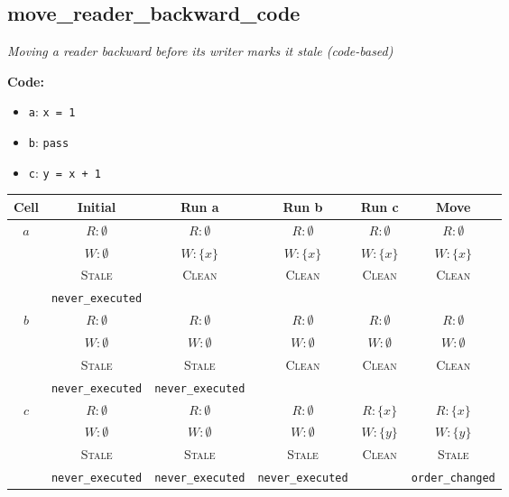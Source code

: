 \documentclass{article}
\begin{document}
\subsection{move\_reader\_backward\_code}
\textit{Moving a reader backward before its writer marks it stale (code-based)}

\textbf{Code:}
\begin{itemize}
  \item \texttt{a}: \verb|x = 1|
  \item \texttt{b}: \verb|pass|
  \item \texttt{c}: \verb|y = x + 1|
\end{itemize}

\begin{center}
\small
\begin{tabular}{|c|c|c|c|c|c|}
\hline
\textbf{Cell} & \textbf{Initial} & \textbf{Run a} & \textbf{Run b} & \textbf{Run c} & \textbf{Move} \\
\hline
\multirow{4}{*}{$a$}
  & $R: \emptyset$ & $R: \emptyset$ & $R: \emptyset$ & $R: \emptyset$ & $R: \emptyset$ \\
  & $W: \emptyset$ & $W: \{x\}$ & $W: \{x\}$ & $W: \{x\}$ & $W: \{x\}$ \\
  & \textsc{Stale} & \textsc{Clean} & \textsc{Clean} & \textsc{Clean} & \textsc{Clean} \\
  & \footnotesize\texttt{never\_executed} &  &  &  &  \\
\hline
\multirow{4}{*}{$b$}
  & $R: \emptyset$ & $R: \emptyset$ & $R: \emptyset$ & $R: \emptyset$ & $R: \emptyset$ \\
  & $W: \emptyset$ & $W: \emptyset$ & $W: \emptyset$ & $W: \emptyset$ & $W: \emptyset$ \\
  & \textsc{Stale} & \textsc{Stale} & \textsc{Clean} & \textsc{Clean} & \textsc{Clean} \\
  & \footnotesize\texttt{never\_executed} & \footnotesize\texttt{never\_executed} &  &  &  \\
\hline
\multirow{4}{*}{$c$}
  & $R: \emptyset$ & $R: \emptyset$ & $R: \emptyset$ & $R: \{x\}$ & $R: \{x\}$ \\
  & $W: \emptyset$ & $W: \emptyset$ & $W: \emptyset$ & $W: \{y\}$ & $W: \{y\}$ \\
  & \textsc{Stale} & \textsc{Stale} & \textsc{Stale} & \textsc{Clean} & \textsc{Stale} \\
  & \footnotesize\texttt{never\_executed} & \footnotesize\texttt{never\_executed} & \footnotesize\texttt{never\_executed} &  & \footnotesize\texttt{order\_changed} \\
\hline
\end{tabular}
\end{center}
\end{document}
